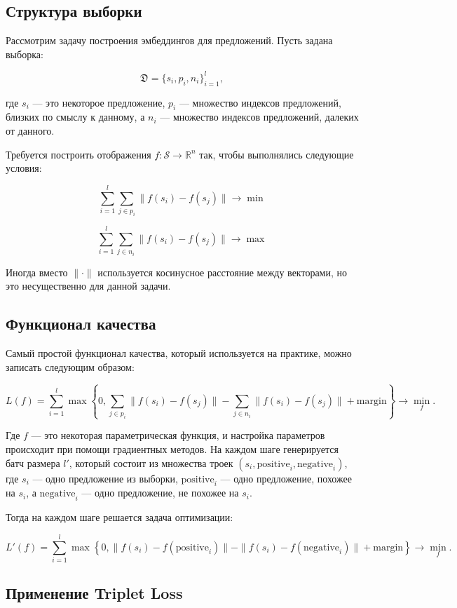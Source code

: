 \subsection*{Структура выборки}

Рассмотрим задачу построения эмбеддингов для предложений. Пусть задана выборка:

$$
    \mathfrak{D} = \{s_i, p_i, n_i\}_{i=1}^{l},
$$

где $s_i$ — это некоторое предложение, $p_i$ — множество индексов предложений, близких по смыслу к данному, а $n_i$ — множество индексов предложений, далеких от данного.

Требуется построить отображения $f : \mathcal{S} \to \mathbb{R}^{n}$ так, чтобы выполнялись следующие условия:

$$
    \sum_{i=1}^{l}\sum_{j \in p_i} \|f(s_i) - f(s_j)\| \to \min
$$

$$
    \sum_{i=1}^{l}\sum_{j \in n_i} \|f(s_i) - f(s_j)\| \to \max
$$

Иногда вместо $\|\cdot\|$ используется косинусное расстояние между векторами, но это несущественно для данной задачи.

\subsection*{Функционал качества}

Самый простой функционал качества, который используется на практике, можно записать следующим образом:

$$
    L(f) = \sum_{i=1}^{l}\max\left\{0, \sum_{j \in p_i}\|f(s_i) - f(s_j)\| - \sum_{j \in n_i}\|f(s_i) - f(s_j)\| + \text{margin}\right\} \to \min_{f}.
$$

Где $f$ — это некоторая параметрическая функция, и настройка параметров происходит при помощи градиентных методов. На каждом шаге генерируется батч размера $l'$, который состоит из множества троек $(s_i, \text{positive}_i, \text{negative}_i)$, где $s_i$ — одно предложение из выборки, $\text{positive}_i$ — одно предложение, похожее на $s_i$, а $\text{negative}_i$ — одно предложение, не похожее на $s_i$.

Тогда на каждом шаге решается задача оптимизации:

$$
    L'(f) = \sum_{i=1}^{l}\max\left\{0, \|f(s_i) - f(\text{positive}_i)\| - \|f(s_i) - f(\text{negative}_i)\| + \text{margin}\right\} \to \min_{f}.
$$

\subsection*{Применение Triplet Loss}

